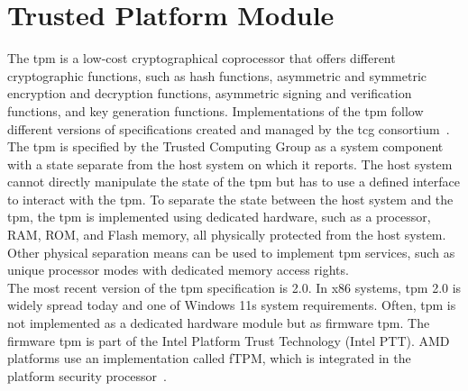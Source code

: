 \section{Trusted Platform Module}
\label{sec:20:tpm}
The \gls{tpm} is a low-cost cryptographical coprocessor that offers different
cryptographic functions, such as hash functions, asymmetric and symmetric
encryption and decryption functions, asymmetric signing and verification
functions, and key generation functions. Implementations of the \gls{tpm} follow
different versions of specifications created and managed by the \gls{tcg}
consortium~\cite{tpm_architecture}. The \gls{tpm} is specified by the Trusted
Computing Group as a system component with a state separate from the host system
on which it reports. The host system cannot directly manipulate the state of the
\gls{tpm} but has to use a defined interface to interact with the \gls{tpm}. To
separate the state between the host system and the \gls{tpm}, the \gls{tpm} is
implemented using dedicated hardware, such as a processor, RAM, ROM, and Flash
memory, all physically protected from the host system. Other physical separation
means can be used to implement \gls{tpm} services, such as unique processor
modes with dedicated memory access rights.\\

The most recent version of the \gls{tpm} specification is 2.0.
In x86 systems, \gls{tpm} 2.0 is widely spread today and one of Windows 11s
system requirements. Often, \gls{tpm} is not implemented as a dedicated hardware
module but as firmware \gls{tpm}. The firmware \gls{tpm} is part of the Intel
Platform Trust Technology (Intel PTT). AMD platforms use an implementation
called fTPM, which is integrated in the platform security
processor~\cite{pirker2024brief}. \\


